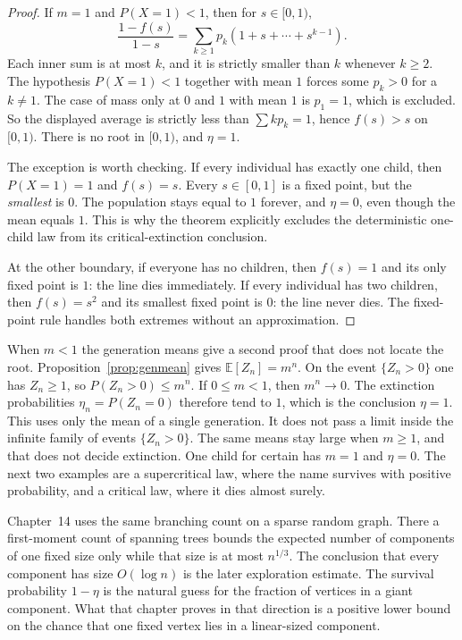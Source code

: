 \begin{proof}
If $m=1$ and $P(X=1)<1$, then for $s\in[0,1)$,
\[
 \frac{1-f(s)}{1-s}=\sum_{k\ge1}p_k(1+s+\cdots+s^{k-1}).
\]
Each inner sum is at most $k$, and it is strictly smaller than $k$ whenever $k\ge2$. The hypothesis $P(X=1)<1$ together with mean $1$ forces some $p_k>0$ for a $k\ne1$. The case of mass only at $0$ and $1$ with mean $1$ is $p_1=1$, which is excluded. So the displayed average is strictly less than $\sum k p_k=1$, hence $f(s)>s$ on $[0,1)$. There is no root in $[0,1)$, and $\eta=1$.

The exception is worth checking. If every individual has exactly one child, then $P(X=1)=1$ and $f(s)=s$. Every $s\in[0,1]$ is a fixed point, but the \emph{smallest} is $0$. The population stays equal to $1$ forever, and $\eta=0$, even though the mean equals $1$. This is why the theorem explicitly excludes the deterministic one-child law from its critical-extinction conclusion.

At the other boundary, if everyone has no children, then $f(s)=1$ and its only fixed point is $1$: the line dies immediately. If every individual has two children, then $f(s)=s^2$ and its smallest fixed point is $0$: the line never dies. The fixed-point rule handles both extremes without an approximation.
\end{proof}

When $m<1$ the generation means give a second proof that does not locate the root. Proposition~\ref{prop:genmean} gives $\mathbb E[Z_n]=m^n$. On the event $\{Z_n>0\}$ one has $Z_n\ge1$, so $P(Z_n>0)\le m^n$. If $0\le m<1$, then $m^n\to0$. The extinction probabilities $\eta_n=P(Z_n=0)$ therefore tend to $1$, which is the conclusion $\eta=1$. This uses only the mean of a single generation. It does not pass a limit inside the infinite family of events $\{Z_n>0\}$. The same means stay large when $m\ge1$, and that does not decide extinction. One child for certain has $m=1$ and $\eta=0$. The next two examples are a supercritical law, where the name survives with positive probability, and a critical law, where it dies almost surely.

Chapter~14 uses the same branching count on a sparse random graph. There a first-moment count of spanning trees bounds the expected number of components of one fixed size only while that size is at most $n^{1/3}$. The conclusion that every component has size $O(\log n)$ is the later exploration estimate. The survival probability $1-\eta$ is the natural guess for the fraction of vertices in a giant component. What that chapter proves in that direction is a positive lower bound on the chance that one fixed vertex lies in a linear-sized component.

